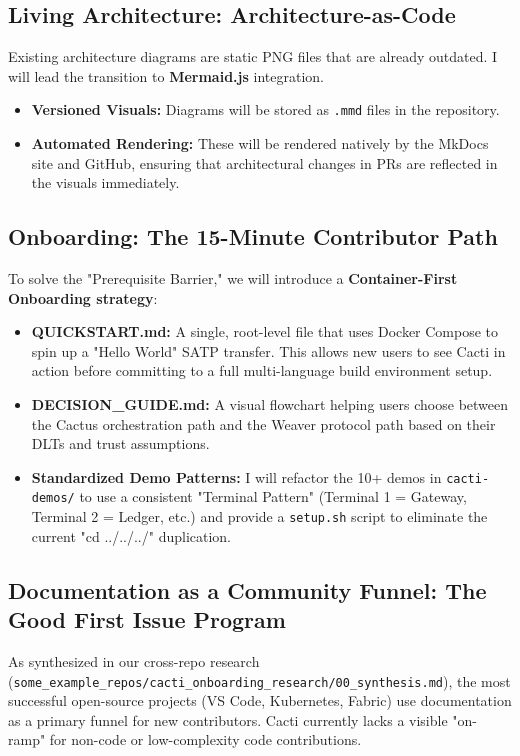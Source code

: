 \subsection{Living Architecture: Architecture-as-Code}
Existing architecture diagrams are static PNG files that are already outdated. I will lead the transition to \textbf{Mermaid.js} integration. 
\begin{itemize}
    \item \textbf{Versioned Visuals:} Diagrams will be stored as \texttt{.mmd} files in the repository.
    \item \textbf{Automated Rendering:} These will be rendered natively by the MkDocs site and GitHub, ensuring that architectural changes in PRs are reflected in the visuals immediately.
\end{itemize}

\subsection{Onboarding: The 15-Minute Contributor Path}
To solve the "Prerequisite Barrier," we will introduce a \textbf{Container-First Onboarding strategy}:
\begin{itemize}[leftmargin=*]
    \item \textbf{QUICKSTART.md:} A single, root-level file that uses Docker Compose to spin up a "Hello World" SATP transfer. This allows new users to see Cacti in action before committing to a full multi-language build environment setup.
    \item \textbf{DECISION\_GUIDE.md:} A visual flowchart helping users choose between the Cactus orchestration path and the Weaver protocol path based on their DLTs and trust assumptions.
    \item \textbf{Standardized Demo Patterns:} I will refactor the 10+ demos in \texttt{cacti-demos/} to use a consistent "Terminal Pattern" (Terminal 1 = Gateway, Terminal 2 = Ledger, etc.) and provide a \texttt{setup.sh} script to eliminate the current "cd ../../../" duplication.
\end{itemize}

\subsection{Documentation as a Community Funnel: The Good First Issue Program}
As synthesized in our cross-repo research (\texttt{some\_example\_repos/cacti\_onboarding\_research/00\_synthesis.md}), the most successful open-source projects (VS Code, Kubernetes, Fabric) use documentation as a primary funnel for new contributors. Cacti currently lacks a visible "on-ramp" for non-code or low-complexity code contributions. 

